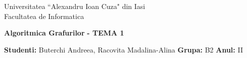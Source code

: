 \documentclass{article}
\begin{document}
\begin{titlepage}

\begin{center}
Universitatea ``Alexandru Ioan Cuza" din Iasi\\
Facultatea de Informatica\\
\end{center}

\vspace{80mm}
 
\begin{center}
\begin{Huge}
\textbf{Algoritmica Grafurilor}
\textbf{ - TEMA 1}
\end{Huge}
\end{center}
 
\vspace{60mm}
\begin{center}
\begin{Large}
\textbf{Studenti:} Buterchi Andreea, Racovita Madalina-Alina
\newline
\textbf{Grupa:} B2
\textbf{Anul:} II
\end{Large}
\end{center}
\vfill

\end{titlepage}
\end{document}

